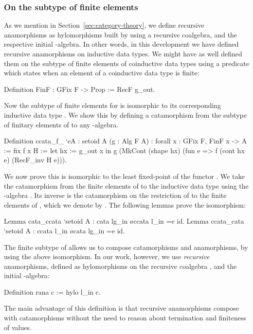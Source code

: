 \documentclass[a4paper,UKenglish,cleveref, autoref, thm-restate]{lipics-v2021}
\begin{document}
\subsubsection{On the subtype of finite elements}
As we mention in
Section~\ref{sec:category-theory}, we define recursive anamorphisms as
hylomorphisms built by using a recursive coalgebra, and the respective
initial -algebra.
In other words, in this development we have defined recursive anamorphisms on
inductive data types.  We might have as well defined them on the subtype of
finite elements of coinductive data types using a predicate which states when an
element of a coinductive data type is finite:
\begin{coqcode}
Definition FinF : GFix F -> Prop := RecF g_out.
\end{coqcode}
Now the subtype  of finite elements for 
is isomorphic to its corresponding inductive data type .
We show this by
defining a catamorphism  from the
subtype  of finitary elements of  to
any -algebra.
\begin{coqcode}
Definition ccata_f_ `{eA : setoid A} (g : Alg F A)
  : forall x : GFix F, FinF x -> A := fix f x H :=
    let hx := g_out x in
      g (MkCont (shape hx) (fun e => f (cont hx e) (RecF_inv H e))).
\end{coqcode}
We now prove this is isomorphic to the least fixed-point of the functor
.
We take the catamorphism from the finite elements of  to the
inductive data type  using the -algebra . Its
inverse is the catamorphism on the restriction of  to the finite
elements of , which we denote by .  The following lemmas
prove the isomorphism:
\begin{coqcode}
Lemma cata_ccata `{setoid A} : cata lg_in \o ccata l_in =e id.
Lemma ccata_cata `{setoid A} : ccata l_in \o cata lg_in =e id.
\end{coqcode}
The finite subtype of  allows us to compose
catamorphisms and anamorphisms, by using the above isomorphism. In our work,
however, we use \emph{recursive} anamorphisms, defined as hylomorphisms on the
 recursive coalgebra , and the initial -algebra:
\begin{coqcode}
Definition rana c := hylo l_in c.
\end{coqcode}
The main advantage of this definition is that recursive anamorphisms compose
with catamorphisms without the need to reason about termination and finiteness
of values.
\end{document}
